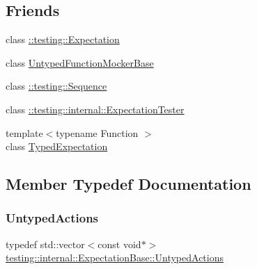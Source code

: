 \subsection*{Friends}
\begin{DoxyCompactItemize}
\item 
class \hyperlink{classtesting_1_1internal_1_1_expectation_base_a86fa3dccdc465d897ee321b74e4ce915}{\+::testing\+::\+Expectation}
\item 
class \hyperlink{classtesting_1_1internal_1_1_expectation_base_a3e5598b244ec7673d0a494477d71e559}{Untyped\+Function\+Mocker\+Base}
\item 
class \hyperlink{classtesting_1_1internal_1_1_expectation_base_aeaf43a487a21c0ac1135b094a1561056}{\+::testing\+::\+Sequence}
\item 
class \hyperlink{classtesting_1_1internal_1_1_expectation_base_a83859ffda7f75bb8b447063eb53cb8b8}{\+::testing\+::internal\+::\+Expectation\+Tester}
\item 
{\footnotesize template$<$typename Function $>$ }\\class \hyperlink{classtesting_1_1internal_1_1_expectation_base_a4f17de55396a8ef740d5ad2b1380a851}{Typed\+Expectation}
\end{DoxyCompactItemize}


\subsection{Member Typedef Documentation}
\mbox{\label{classtesting_1_1internal_1_1_expectation_base_a9b21e82059961b9f1198d3f5d518254f}} 
\subsubsection{\texorpdfstring{Untyped\+Actions}{UntypedActions}}
{\footnotesize\ttfamily typedef std\+::vector$<$const void$\ast$$>$ \hyperlink{classtesting_1_1internal_1_1_expectation_base_a9b21e82059961b9f1198d3f5d518254f}{testing\+::internal\+::\+Expectation\+Base\+::\+Untyped\+Actions}\hspace{0.3cm}{\ttfamily [protected]}}



